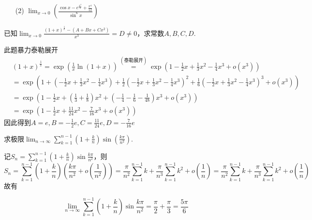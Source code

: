 \begin{xiti}
\begin{enumerate}
	\item[(2)] $\lim _ { x \rightarrow 0 } \left( \frac { \cos x - e ^ { \frac { x ^ { 2 } } { 2 } } + \frac { x ^ { 4 } } { 12 } } { \sin ^ { 6 } x } \right)$
\end{enumerate}
\item 已知$\lim _ { x \rightarrow 0 } \frac { ( 1 + x ) ^ { \frac { 1 } { x } } - \left( A + B x + C x ^ { 2 } \right) } { x ^ { 3 } } = D \neq 0$，求常数$A,B,C,D$.
\begin{solution}
	此题暴力泰勒展开
	\begin{equation*}
	\begin{aligned}
	&(1+x)^{\frac{1}{x}}=\exp(\frac{1}{x} \ln (1+x)) \stackrel{(\text{泰勒展开})}{=}\exp\left(1-\frac{1}{2}x+\frac{1}{3}x^2-\frac{1}{4}x^3+o\left(x^3\right)\right)\\
	&=\exp\left(1+\left(-\frac{1}{2}x+\frac{1}{3}x^2-\frac{1}{4}x^3\right)+\frac{1}{2}\left(-\frac{1}{2}x+\frac{1}{3}x^2-\frac{1}{4}x^3\right)^2+\frac{1}{6}\left(-\frac{1}{2}x+\frac{1}{3}x^2-\frac{1}{4}x^3\right)^3+o\left(x^3\right)\right) \\
	&=\exp\left(1-\frac{1}{2}x+\left(\frac{1}{3}+\frac{1}{8}\right)x^2+\left(-\frac{1}{4}-\frac{1}{6}-\frac{1}{48}\right)x^3+o\left(x^3\right)\right)\\
	&=\exp\left(1-\frac{1}{2}x+\frac{11}{24}x^2-\frac{7}{16}x^3+o\left(x^3\right)\right)
	\end{aligned}
	\end{equation*}
	因此得到$A=e, B=-\frac{1}{2}e, C=\frac{11}{24} e, D=-\frac{7}{16}e$
\end{solution}
\item 求极限$\lim _ { n \rightarrow \infty } \sum _ { k = 1 } ^ { n - 1 } \left( 1 + \frac { k } { n } \right) \sin \left( \frac { k \pi } { n ^ { 2 } } \right)$.
\begin{solution}
	记$S_{n}=\sum_{k=1}^{n-1}\left(1+\frac{k}{n}\right) \sin \frac{k \pi}{n^{2}}$，则
	\[
	S_{n}=\sum_{k=1}^{n-1}\left(1+\frac{k}{n}\right)\left(\frac{k \pi}{n^{2}}+o\left(\frac{1}{n^{2}}\right)\right)=\frac{\pi}{n^{2}} \sum_{k=1}^{n-1} k+\frac{\pi}{n^{3}} \sum_{k=1}^{n-1} k^{2}+o\left(\frac{1}{n}\right)=\frac{\pi}{n^{2}} \sum_{k=1}^{n-1} k+\frac{\pi}{n^{3}} \sum_{k=1}^{n-1} k^{2}+o\left(\frac{1}{n}\right)
	\]
	故有
	
	\[\lim _{n \rightarrow \infty} \sum_{k=1}^{n-1}\left(1+\frac{k}{n}\right) \sin \frac{k \pi}{n^{2}}=\frac{\pi}{2}+\frac{\pi}{3}=\frac{5 \pi}{6}\]
	

\end{solution}
\end{xiti}
